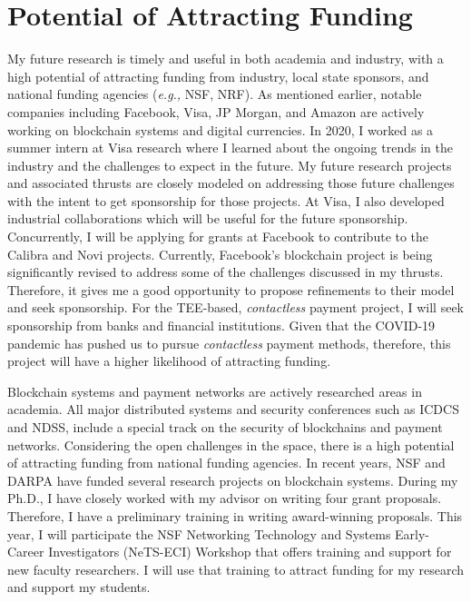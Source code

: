 \documentclass{NSF}
\newcommand{\eg}{{\em e.g.,}\xspace}
\begin{document}
\section{Potential of Attracting Funding}\vspace{-1mm}
My future research is timely and useful in both academia and industry, with a high potential of attracting funding from industry, local state sponsors, and national funding agencies (\eg NSF, NRF). As mentioned earlier, notable companies including Facebook, Visa, JP Morgan, and Amazon are actively working on blockchain systems and digital currencies. In 2020, I worked as a summer intern at Visa research where I learned about the ongoing trends in the industry and the challenges to expect in the future. My future research projects and associated thrusts are closely modeled on addressing those future challenges with the intent to get sponsorship for those projects. At Visa, I also developed industrial collaborations which will be useful for the future sponsorship. Concurrently, I will be applying for grants at Facebook to contribute to the Calibra and Novi projects. Currently, Facebook's blockchain project is being significantly revised to address some of the challenges discussed in my thrusts. Therefore, it gives me a good opportunity to propose refinements to their model and seek sponsorship. For the TEE-based, {\em contactless} payment project, I will seek sponsorship from banks and financial institutions. Given that the COVID-19 pandemic has pushed us to pursue {\em contactless} payment methods, therefore, this project will have a higher likelihood of attracting funding. 

Blockchain systems and payment networks are actively researched areas in academia. All major distributed systems and security conferences such as ICDCS and NDSS, include a special track on the security of blockchains and payment networks. Considering the open challenges in the space, there is a high potential of attracting funding from national funding agencies. In recent years, NSF and DARPA have funded several research projects on blockchain systems. During my Ph.D., I have closely worked with my advisor on writing four grant proposals. Therefore, I have a preliminary training in writing award-winning proposals. This year, I will participate the NSF Networking Technology and Systems Early-Career Investigators (NeTS-ECI) Workshop that offers training and support for new faculty researchers. I will use that training to attract funding for my research and support my students. 
\end{document}

